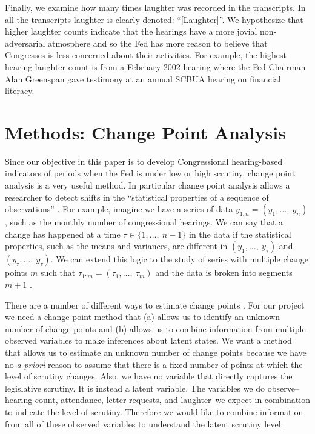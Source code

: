 \documentclass[a4paper]{article}\usepackage[]{graphicx}\usepackage[]{color}
\begin{document}
Finally, we examine how many times laughter was recorded in the transcripts. In all the transcripts laughter is clearly denoted: ``[Laughter]''. We hypothesize that higher laughter counts indicate that the hearings have a more jovial non-adversarial atmosphere and so the Fed has more reason to believe that Congresses is less concerned about their activities. For example, the highest hearing laughter count is from a February 2002 hearing where the Fed Chairman Alan Greenspan gave testimony at an annual SCBUA hearing on financial literacy.

\section{Methods: Change Point Analysis}

Since our objective in this paper is to develop Congressional hearing-based indicators of periods when the Fed is under low or high scrutiny, change point analysis is a very useful method. In particular change point analysis allows a researcher to detect shifts in the ``statistical properties of a sequence of observations'' \cite[2]{Killick2013}. For example, imagine we have a series of data $y_{1:n} = (y_{1},\ldots,\: y_{n})$, such as the monthly number of congressional hearings.  We can say that a change has happened at a time $\tau \in \{1,\ldots,\:n-1\}$ in the data if the statistical properties, such as the means and variances, are different in $(y_{1},\ldots,\: y_{\tau})$ and $(y_{\tau},\ldots,\: y_{\tau})$. We can extend this logic to the study of series with multiple change points $m$ such that $\tau_{1:m} = (\tau_{1},\ldots,\:\tau_{m})$ and the data is broken into segments $m + 1$ \citep{Killick2012}.

There are a number of different ways to estimate change points \cite[see][]{Killick2013,Matteson2014}. For our project we need a change point method that (a) allows us to identify an unknown number of change points and (b) allows us to combine information from multiple observed variables to make inferences about latent states. We want a method that allows us to estimate an unknown number of change points because we have no \emph{a priori} reason to assume that there is a fixed number of points at which the level of scrutiny changes. Also, we have no variable that directly captures the legislative scrutiny. It is instead a latent variable. The variables we do observe--hearing count, attendance, letter requests, and laughter--we expect in combination to indicate the level of scrutiny. Therefore we would like to combine information from all of these observed variables to understand the latent scrutiny level.
\end{document}
